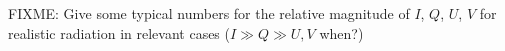 FIXME: Give some typical numbers for the relative magnitude of $I$,
$Q$, $U$, $V$
for realistic radiation in relevant cases ($I \gg Q \gg U,V$ when?)




